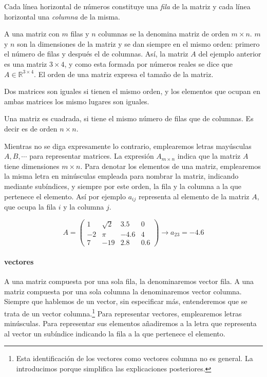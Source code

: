 \begin{paracol}{2}
Cada línea horizontal de números constituye una \emph{fila} de la matriz y cada línea horizontal una \emph{columna} de la misma.

A una matriz con $m$ filas y $n$ columnas se la denomina matriz de orden $m\times n$. $m$ y $n$ son la dimensiones de la matriz y se dan siempre en el mismo orden: primero el número de filas y después el de columnas. Así, la matriz $A$ del ejemplo anterior es una matriz $3\times 4$, y como esta formada por números reales se dice que $A\in\mathbb{R}^{3\times 4}$. El orden de una matriz expresa el tamaño de la matriz.

Dos matrices son iguales si tienen el mismo orden, y los elementos que ocupan en ambas matrices los mismo lugares son iguales.

Una matriz es cuadrada, si tiene el mismo número de filas que de columnas. Es decir es de orden $n\times n$.

Mientras no se diga expresamente lo contrario, emplearemos letras mayúsculas $A, B, \cdots$ para representar matrices. La expresión $A_{m\times n}$ indica que la matriz $A$ tiene dimensiones $m \times n$. Para denotar los elementos de una matriz, emplearemos la misma letra en minúsculas empleada para nombrar la matriz, indicando mediante subíndices, y siempre por este orden, la fila y la columna a la que pertenece el elemento. Así por ejemplo $a_{ij}$ representa al elemento de la matriz $A$, que ocupa la fila $i$ y la columna $j$.
\end{paracol}
\begin{equation*}
A=
\begin{pmatrix}
1& \sqrt{2}& 3.5& 0\\
-2& \pi& -4.6& 4\\
7& -19& 2.8& 0.6
\end{pmatrix}
\rightarrow a_{23}=-4.6
\end{equation*}
\begin{paracol}{2}
\paragraph{vectores}
A una matriz compuesta por una sola fila, la denominaremos vector fila. A una matriz compuesta por una sola columna la denominaremos vector columna. Siempre que hablemos de un vector, sin especificar más, entenderemos que se trata de un vector columna.\footnote{Esta identificación de los vectores como vectores columna no es general. La introducimos porque simplifica las explicaciones posteriores.} Para representar vectores, emplearemos letras minúsculas. Para representar sus elementos añadiremos a la letra que representa al vector un subíndice indicando la fila a la que pertenece el elemento.
\end{paracol}
